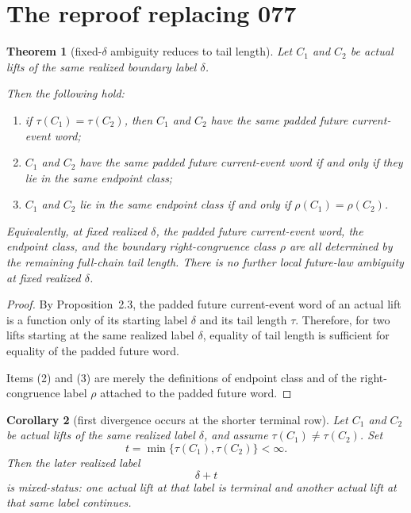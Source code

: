 \documentclass[11pt]{article}
\newtheorem{theorem}{Theorem}[section]
\newtheorem{corollary}[theorem]{Corollary}
\newcommand{\tauv}{\tau}
\begin{document}
\section{The reproof replacing 077}

\begin{theorem}[fixed-$\delta$ ambiguity reduces to tail length]
Let $C_1$ and $C_2$ be actual lifts of the same realized boundary label
$\delta$.

Then the following hold:
\begin{enumerate}[label=\textup{(\arabic*)},leftmargin=2.5em]
\item if $\tauv(C_1)=\tauv(C_2)$, then $C_1$ and $C_2$ have the same padded
      future current-event word;
\item $C_1$ and $C_2$ have the same padded future current-event word if and
      only if they lie in the same endpoint class;
\item $C_1$ and $C_2$ lie in the same endpoint class if and only if
      $\rho(C_1)=\rho(C_2)$.
\end{enumerate}

Equivalently, at fixed realized $\delta$, the padded future current-event word,
the endpoint class, and the boundary right-congruence class $\rho$ are all
determined by the remaining full-chain tail length. There is no further local
future-law ambiguity at fixed realized $\delta$.
\end{theorem}

\begin{proof}
By Proposition~2.3, the padded future current-event word of an actual lift is a
function only of its starting label $\delta$ and its tail length $\tauv$.
Therefore, for two lifts starting at the same realized label $\delta$, equality
of tail length is sufficient for equality of the padded future word.

Items \textup{(2)} and \textup{(3)} are merely the definitions of endpoint class
and of the right-congruence label $\rho$ attached to the padded future word.
\end{proof}

\begin{corollary}[first divergence occurs at the shorter terminal row]
Let $C_1$ and $C_2$ be actual lifts of the same realized label $\delta$, and
assume $\tauv(C_1)\neq\tauv(C_2)$. Set
\[
t = \min\{\tauv(C_1),\tauv(C_2)\} < \infty.
\]
Then the later realized label
\[
\delta+t
\]
is mixed-status: one actual lift at that label is terminal and another actual
lift at that same label continues.
\end{corollary}
\end{document}
